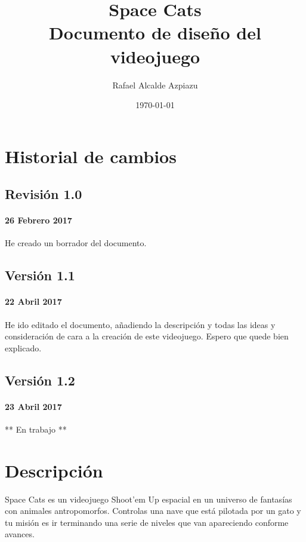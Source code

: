 \documentclass[12pt, spanish, a4paper]{article}
\title{Space Cats \\ Documento de diseño del videojuego}
\date{\today}
\author{Rafael Alcalde Azpiazu}
\begin{document}
	
	\maketitle
	\newpage
	
	\tableofcontents
	\newpage
	
	
	\section{Historial de cambios}
	
	\subsection{Revisión 1.0}
	
	\paragraph{26 Febrero 2017} He creado un borrador del documento.
	
	\subsection{Versión 1.1}
	
	\paragraph{22 Abril 2017} He ido editado el documento, añadiendo la descripción y todas las ideas y consideración de cara a la creación de este videojuego. Espero que quede bien explicado.
	
	\subsection{Versión 1.2}
	
	\paragraph{23 Abril 2017} ** En trabajo **
	
	\newpage
	
	\section{Descripción}
	
	Space Cats es un videojuego Shoot'em Up espacial en un universo de fantasías con animales antropomorfos. Controlas una nave que está pilotada por un gato y tu misión es ir terminando una serie de niveles que van apareciendo conforme avances. \\
	
\end{document}
